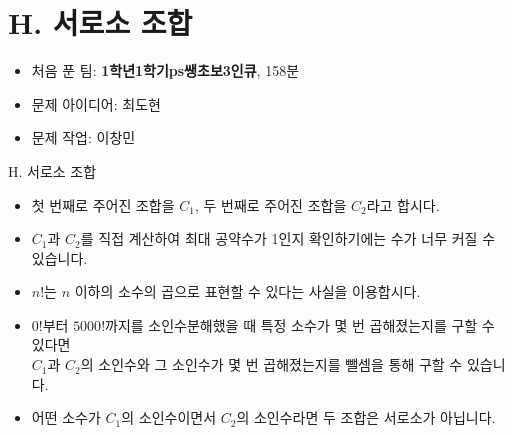 \def\probno{H}
\def\probtitle{서로소 조합}

\section{\probno{}. \probtitle{}}

\begin{frame} %
    \sectiontitle{\probno{}}{\probtitle{}}
    \begin{itemize}
        \item 처음 푼 팀: \textbf{1학년1학기ps쌩초보3인큐}, 158분
        \item 문제 아이디어: 최도현
        \item 문제 작업: 이창민
    \end{itemize}
\end{frame}

\begin{frame}{\probno{}. \probtitle{}}
    \begin{itemize}
        \item 첫 번째로 주어진 조합을 $C_1$, 두 번째로 주어진 조합을 $C_2$라고 합시다.
        \item $C_1$과 $C_2$를 직접 계산하여 최대 공약수가 1인지 확인하기에는 수가 너무 커질 수 있습니다.
        \vspace{3mm}
        \item $n!$는 $n$ 이하의 소수의 곱으로 표현할 수 있다는 사실을 이용합시다.
        \item $0!$부터 $5000!$까지를 소인수분해했을 때 특정 소수가 몇 번 곱해졌는지를 구할 수 있다면\\
        $C_1$과 $C_2$의 소인수와 그 소인수가 몇 번 곱해졌는지를 뺄셈을 통해 구할 수 있습니다.
        \item 어떤 소수가 $C_1$의 소인수이면서 $C_2$의 소인수라면 두 조합은 서로소가 아닙니다.
    \end{itemize}
\end{frame}

